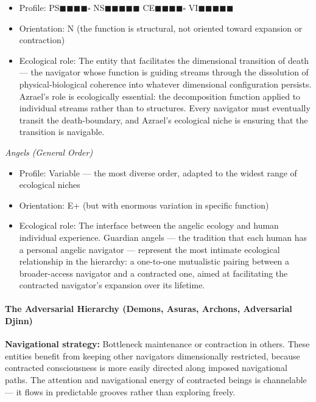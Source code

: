 \begin{itemize}[nosep,leftmargin=*]
  \item Profile: PS$\blacksquare$$\blacksquare$$\blacksquare$$\blacksquare$$\square$ NS$\blacksquare$$\blacksquare$$\blacksquare$$\blacksquare$$\blacksquare$ CE$\blacksquare$$\blacksquare$$\blacksquare$$\blacksquare$$\square$ VI$\blacksquare$$\blacksquare$$\blacksquare$$\blacksquare$$\blacksquare$
  \item Orientation: N (the function is structural, not oriented toward expansion or contraction)
  \item Ecological role: The entity that facilitates the dimensional transition of death — the navigator whose function is guiding streams through the dissolution of physical-biological coherence into whatever dimensional configuration persists. Azrael's role is ecologically essential: the decomposition function applied to individual streams rather than to structures. Every navigator must eventually transit the death-boundary, and Azrael's ecological niche is ensuring that the transition is navigable.
\end{itemize}


\textit{Angels (General Order)}

\begin{itemize}[nosep,leftmargin=*]
  \item Profile: Variable — the most diverse order, adapted to the widest range of ecological niches
  \item Orientation: E+ (but with enormous variation in specific function)
  \item Ecological role: The interface between the angelic ecology and human individual experience. Guardian angels — the tradition that each human has a personal angelic navigator — represent the most intimate ecological relationship in the hierarchy: a one-to-one mutualistic pairing between a broader-access navigator and a contracted one, aimed at facilitating the contracted navigator's expansion over its lifetime.
\end{itemize}


\paragraph*{The Adversarial Hierarchy (Demons, Asuras, Archons, Adversarial Djinn)}


\textbf{Navigational strategy:} Bottleneck maintenance or contraction in others. These entities benefit from keeping other navigators dimensionally restricted, because contracted consciousness is more easily directed along imposed navigational paths. The attention and navigational energy of contracted beings is channelable — it flows in predictable grooves rather than exploring freely.


